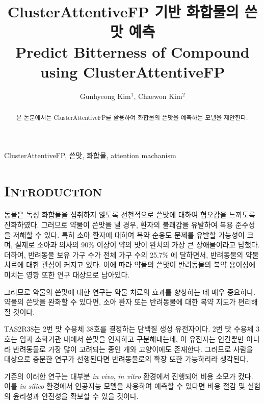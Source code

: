 \documentclass[9pt]{ieeeconf}
\begin{document}
\title{ClusterAttentiveFP 기반 화합물의 쓴맛 예측\\
    \large Predict Bitterness of Compound using ClusterAttentiveFP}

\author{Gunhyeong Kim$^{1}$, Chaewon Kim$^{2}$}
\maketitle
\begin{abstract}
    본 논문에서는 ClusterAttentiveFP를 활용하여 화합물의 쓴맛을 예측하는 모델을 제안한다.
\end{abstract}
\begin{keywords}
    ClusterAttentiveFP, 쓴맛, 화합물, attention machanism
\end{keywords}


\section[short]{\Large {\textsc{Introduction}}}

\indent 동물은 독성 화합물을 섭취하지 않도록 선천적으로 쓴맛에 대하여 혐오감을 느끼도록 진화하였다.
그러므로 약물이 쓴맛을 낼 경우, 환자의 불쾌감을 유발하여 복용 준수성을 저해할 수 있다\cite{dagan2017bitter}.
특히 소아 환자에 대하여 복약 순응도 문제를 유발할 가능성이 크며\cite{bahia2018bitterness},
실제로 소아과 의사의 90\% 이상이 약의 맛이 완치의 가장 큰 장애물이라고 답했다\cite{mennella2013bad}.
더하여, 반려동물 보유 가구 수가 전체 가구 수의 25.7\% 에 달하면서, 반려동물의 약물 치료에 대한 관심이 커지고 있다.
이에 따라 약물의 쓴맛이 반려동물의 복약 용이성에 미치는 영향 또한 연구 대상으로 남아있다.

\indent 그러므로 약물의 쓴맛에 대한 연구는 약물 치료의 효과를 향상하는 데 매우 중요하다.
약물의 쓴맛을 완화할 수 있다면, 소아 환자 또는 반려동물에 대한 복약 지도가 편리해질 것이다.

\indent TAS2R38는 2번 맛 수용체 38호를 결정하는 단백질 생성 유전자이다.
2번 맛 수용체 3호는 입과 소화기관 내에서 쓴맛을 인지하고 구분해내는데, 이 유전자는 인간뿐만 아니라 반려동물로 가장 많이 고려되는 종인 개와 고양이에도 존재한다.
그러므로 사람을 대상으로 충분한 연구가 선행된다면 반려동물로의 확장 또한 가능하리라 생각된다.

\indent 기존의 이러한 연구는 대부분 \textit{in vivo}, \textit{in vitro} 환경에서 진행되어 비용 소모가 컸다.
이를 \textit{in silico} 환경에서 인공지능 모델을 사용하여 예측할 수 있다면 비용 절감 및 실험의 윤리성과 안전성을 확보할 수 있을 것이다.
\end{document}
